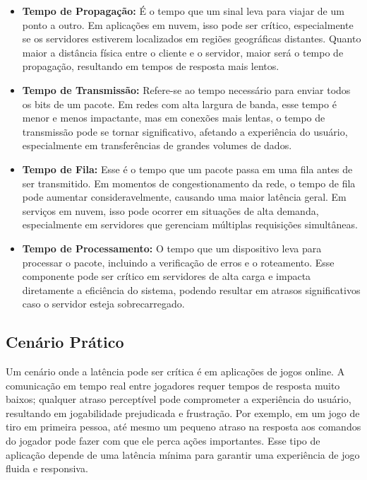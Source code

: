 \documentclass[a4paper,12pt]{article}
\begin{document}
\begin{itemize}
    \item \textbf{Tempo de Propagação:} É o tempo que um sinal leva para viajar de um ponto a outro. Em aplicações em nuvem, isso pode ser crítico, especialmente se os servidores estiverem localizados em regiões geográficas distantes. Quanto maior a distância física entre o cliente e o servidor, maior será o tempo de propagação, resultando em tempos de resposta mais lentos.

    \item \textbf{Tempo de Transmissão:} Refere-se ao tempo necessário para enviar todos os bits de um pacote. Em redes com alta largura de banda, esse tempo é menor e menos impactante, mas em conexões mais lentas, o tempo de transmissão pode se tornar significativo, afetando a experiência do usuário, especialmente em transferências de grandes volumes de dados.

    \item \textbf{Tempo de Fila:} Esse é o tempo que um pacote passa em uma fila antes de ser transmitido. Em momentos de congestionamento da rede, o tempo de fila pode aumentar consideravelmente, causando uma maior latência geral. Em serviços em nuvem, isso pode ocorrer em situações de alta demanda, especialmente em servidores que gerenciam múltiplas requisições simultâneas.

    \item \textbf{Tempo de Processamento:} O tempo que um dispositivo leva para processar o pacote, incluindo a verificação de erros e o roteamento. Esse componente pode ser crítico em servidores de alta carga e impacta diretamente a eficiência do sistema, podendo resultar em atrasos significativos caso o servidor esteja sobrecarregado.
\end{itemize}

\subsection*{Cenário Prático}
Um cenário onde a latência pode ser crítica é em aplicações de jogos online. A comunicação em tempo real entre jogadores requer tempos de resposta muito baixos; qualquer atraso perceptível pode comprometer a experiência do usuário, resultando em jogabilidade prejudicada e frustração. Por exemplo, em um jogo de tiro em primeira pessoa, até mesmo um pequeno atraso na resposta aos comandos do jogador pode fazer com que ele perca ações importantes. Esse tipo de aplicação depende de uma latência mínima para garantir uma experiência de jogo fluida e responsiva.
\end{document}

